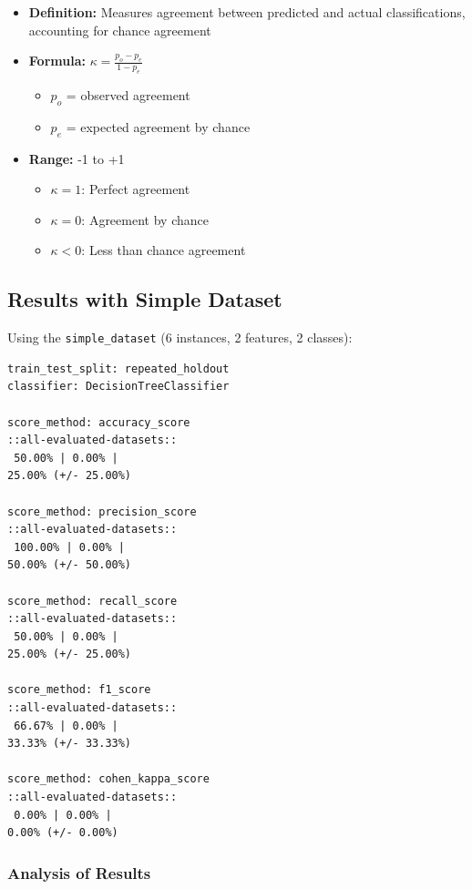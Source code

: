 \documentclass[12pt,a4paper]{article}
\begin{document}
\begin{itemize}
    \item \textbf{Definition:} Measures agreement between predicted and actual classifications, accounting for chance agreement
    \item \textbf{Formula:} $\kappa = \frac{p_o - p_e}{1 - p_e}$
    \begin{itemize}
        \item $p_o$ = observed agreement
        \item $p_e$ = expected agreement by chance
    \end{itemize}
    \item \textbf{Range:} -1 to +1
    \begin{itemize}
        \item $\kappa = 1$: Perfect agreement
        \item $\kappa = 0$: Agreement by chance
        \item $\kappa < 0$: Less than chance agreement
    \end{itemize}
\end{itemize}

\subsection{Results with Simple Dataset}

Using the \texttt{simple\_dataset} (6 instances, 2 features, 2 classes):

\begin{verbatim}
train_test_split: repeated_holdout
classifier: DecisionTreeClassifier

score_method: accuracy_score
::all-evaluated-datasets::
 50.00% | 0.00% |
25.00% (+/- 25.00%)

score_method: precision_score
::all-evaluated-datasets::
 100.00% | 0.00% |
50.00% (+/- 50.00%)

score_method: recall_score
::all-evaluated-datasets::
 50.00% | 0.00% |
25.00% (+/- 25.00%)

score_method: f1_score
::all-evaluated-datasets::
 66.67% | 0.00% |
33.33% (+/- 33.33%)

score_method: cohen_kappa_score
::all-evaluated-datasets::
 0.00% | 0.00% |
0.00% (+/- 0.00%)
\end{verbatim}

\subsubsection{Analysis of Results}
\end{document}

